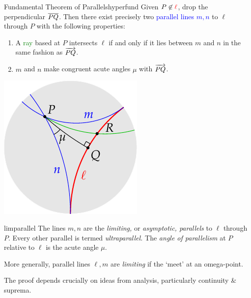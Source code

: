\begin{thm}[lower separated=false, sidebyside, sidebyside align=top seam, sidebyside gap=0pt, righthand width=0.25\linewidth]{Fundamental Theorem of Parallels}{hyperfund}
Given $P\not\in\textcolor{red}{\ell}$, drop the perpendicular $\overline{PQ}$. Then there exist precisely two \textcolor{blue}{parallel lines $m,n$} to $\ell$ through $P$ with the following properties:
\begin{enumerate}\itemsep0pt
  \item A \textcolor{Green}{ray} based at $P$ intersects $\ell$ if and only if it lies between $m$ and $n$ in the same fashion as $\overrightarrow{PQ}$.
  \item $m$ and $n$ make congruent acute angles $\mu$ with $\overrightarrow{PQ}$.
\end{enumerate}
\tcblower
\flushright\includegraphics[scale=0.8]{basic-parallels}
\end{thm}

\begin{defn}{}{limparallel}
The lines $m,n$ are the \emph{limiting,} or \emph{asymptotic, parallels} to $\ell$ through $P$. Every other parallel is termed \emph{ultraparallel.} The \emph{angle of parallelism} at $P$ relative to $\ell$ is the acute angle $\mu$.
\end{defn}

More generally, parallel lines $\ell,m$ are \emph{limiting} if the `meet' at an omega-point.\smallbreak


The proof depends crucially on ideas from analysis, particularly continuity \& suprema.
 

